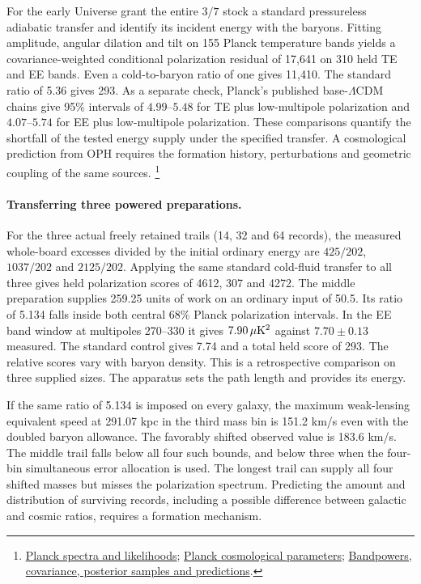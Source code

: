 \documentclass[11pt]{article}
\begin{document}
For the early Universe grant the entire $3/7$ stock a standard
pressureless adiabatic transfer and identify its incident energy with
the baryons. Fitting amplitude, angular dilation and tilt on 155 Planck
temperature bands yields a covariance-weighted conditional polarization
residual of 17,641 on 310 held TE and EE bands. Even a cold-to-baryon
ratio of one gives 11,410. The standard ratio of 5.36 gives 293. As a
separate check, Planck's published base-$\Lambda$CDM chains give 95\%
intervals of $4.99$--$5.48$ for TE plus low-multipole polarization and
$4.07$--$5.74$ for EE plus low-multipole polarization. These comparisons
quantify the shortfall of the tested energy supply under the specified
transfer. A cosmological prediction from OPH requires the formation
history, perturbations and geometric coupling of the same sources.%
\footnote{\href{https://arxiv.org/abs/1907.12875}{Planck spectra and likelihoods};
\href{https://arxiv.org/abs/1807.06209}{Planck cosmological parameters};
\href{https://github.com/FloatingPragma/observer-patch-holography/tree/main/code/cosmology/cold_acoustic_polarization}{Bandpowers, covariance, posterior samples and predictions}.}

\paragraph{Transferring three powered preparations.}
For the three actual freely retained trails (14, 32 and 64 records),
the measured whole-board excesses divided by the initial ordinary
energy are $425/202$, $1037/202$ and $2125/202$. Applying the same
standard cold-fluid transfer to all three gives held polarization scores
of 4612, 307 and 4272. The middle preparation supplies 259.25 units of
work on an ordinary input of 50.5. Its ratio of 5.134 falls inside
both central 68\% Planck polarization intervals. In the EE band window
at multipoles 270--330 it gives $7.90\,\mu{\rm K}^2$ against
$7.70\pm0.13$ measured. The standard control gives 7.74 and a total
held score of 293. The relative scores vary with baryon density.
This is a retrospective comparison on three supplied
sizes. The apparatus sets the path length and provides its energy.

If the same ratio of 5.134 is imposed on every galaxy, the maximum
weak-lensing equivalent speed at 291.07 kpc in the third mass bin is
151.2 km/s even with the doubled baryon allowance. The favorably
shifted observed value is 183.6 km/s. The middle trail falls below all
four such bounds, and below three when the four-bin simultaneous error
allocation is used. The longest trail can supply all four shifted
masses but misses the polarization spectrum. Predicting the amount
and distribution of surviving records, including a possible difference
between galactic and cosmic ratios, requires a formation mechanism.
\end{document}
